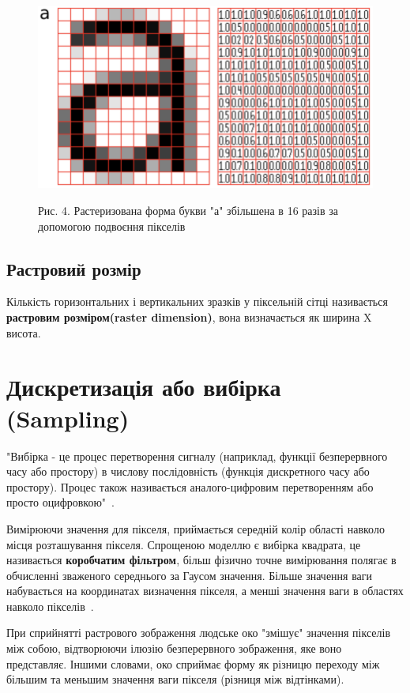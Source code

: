 \documentclass[a4paper,12pt]{article}
\begin{document}
    \begin{figure}
        \label{fig:image4}
        \centering
        \includegraphics[scale=0.5]{image4.png}

        Рис. 4. Растеризована форма букви "а" збільшена в 16 разів за допомогою подвоєння пікселів
    \end{figure}

    \subsection{Растровий розмір}\label{subsec:raster_sdimensions}
    Кількість горизонтальних і вертикальних зразків у піксельній сітці називається \textbf{растровим розміром(raster dimension)}, вона визначається як ширина X висота.


    \section{Дискретизація або вибірка (Sampling)}\label{sec:sampling}
    "Вибірка - це процес перетворення сигналу (наприклад, функції безперервного часу або простору) в числову послідовність (функція дискретного часу або простору).
    Процес також називається аналого-цифровим перетворенням або просто оцифровкою"~\cite{wiki_sampling:2}.

    Вимірюючи значення для пікселя, приймається середній колір області навколо місця розташування пікселя.
    Спрощеною моделлю є вибірка квадрата, це називається \textbf{коробчатим фільтром}, більш фізично точне вимірювання полягає в обчисленні зваженого середнього за Гаусом значення.
    Більше значення ваги набувається на координатах визначення пікселя, а менші значення ваги в областях навколо пікселів~\cite{gimp:1}.

    При сприйнятті растрового зображення людське око "змішує" значення пікселів між собою, відтворюючи ілюзію безперервного зображення, яке воно представляє.
    Іншими словами, око сприймає форму як різницю переходу між більшим та меньшим значення ваги пікселя (різниця між відтінками).
\end{document}
